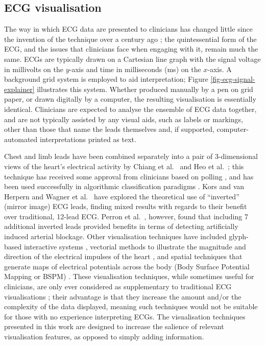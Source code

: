 \documentclass[
  10pt,
  letterpaper,
]{article}
\begin{document}
\subsection{ECG visualisation}\label{sec-ecg-viz}

The way in which ECG data are presented to clinicians has changed little
since the invention of the technique over a century ago
\citep{friedman_2024}; the quintessential form of the ECG, and the
issues that clinicians face when engaging with it, remain much the same.
ECGs are typically drawn on a Cartesian line graph with the signal
voltage in millivolts on the \(y\)-axis and time in milliseconds (ms) on
the \(x\)-axis. A background grid system is employed to aid
interpretation; Figure \ref{fig-ecg-signal-explainer} illustrates this
system. Whether produced manually by a pen on grid paper, or drawn
digitally by a computer, the resulting visualisation is essentially
identical. Clinicians are expected to analyse the ensemble of ECG data
together, and are not typically assisted by any visual aids, such as
labels or markings, other than those that name the leads themselves and,
if supported, computer-automated interpretations printed as text.

Chest and limb leads have been combined separately into a pair of
3-dimensional views of the heart's electrical activity by Chiang et
al.~\citep{chiang_2001} and Heo et al.~\citep{heo_2020}; this technique
has received some approval from clinicians based on polling
\citep{chiang_2001}, and has been used successfully in algorithmic
classification paradigms \citep{heo_2020, fang_2022, bortolan_2023}.
Kors and van Herpern \citep{kors_2008} and Wagner et
al.~\citep{wagner_2008} have explored the theoretical use of
``inverted'' (mirror image) ECG leads, finding mixed results with
regards to their benefit over traditional, 12-lead ECG. Perron et
al.~\citep{perron_2006}, however, found that including 7 additional
inverted leads provided benefits in terms of detecting artificially
induced arterial blockage. Other visualisation techniques have included
glyph-based interactive systems \citep{xu_2018}, vectorial methods to
illustrate the magnitude and direction of the electrical impulses of the
heart \citep{burch_1953, burch_1985, riera_2007, jaros_2019}, and
spatial techniques that generate maps of electrical potentials across
the body (Body Surface Potential Mapping or BSPM)
\citep{lux_1978, taccardi_1998}. These visualisation techniques, while
sometimes useful for clinicians, are only ever considered as
supplementary to traditional ECG visualisations \citep{bond_2013}; their
advantage is that they increase the amount and/or the complexity of the
data displayed, meaning such techniques would not be suitable for those
with no experience interpreting ECGs. The visualisation techniques
presented in this work are designed to increase the salience of relevant
visualisation features, as opposed to simply adding information.
\end{document}
